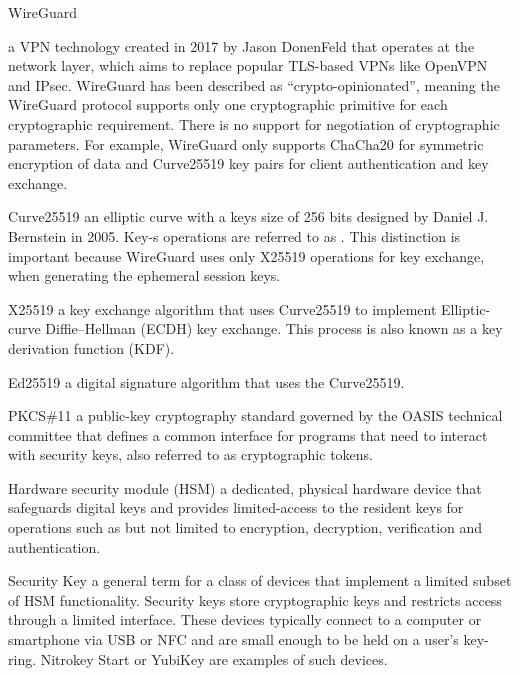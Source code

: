 \documentclass [11pt, proquest] {uwthesis}[2020/02/24]
\begin{document}
\begin{glossary}

\item[WireGuard]

a VPN technology created in 2017 by Jason DonenFeld that operates at the network layer, which aims to replace popular TLS-based VPNs like OpenVPN and IPsec.
WireGuard has been described as “crypto-opinionated”, meaning the WireGuard protocol supports only one cryptographic primitive for each cryptographic requirement.
There is no support for negotiation of cryptographic parameters. For example, WireGuard only supports ChaCha20 for symmetric 
encryption\cite{donenfeld_wireguard_2017} of data and Curve25519 key pairs for client authentication and key exchange.

\item[Curve25519]
an elliptic curve with a keys size of 256 bits designed by Daniel J. Bernstein in 2005\cite{noauthor_curve25519_nodate}. Key-s operations are referred to as . 
This distinction is important because WireGuard uses only X25519 operations for  key exchange, 
when generating the ephemeral session keys.

\item[X25519]
a key exchange algorithm that uses Curve25519 to implement Elliptic-curve Diffie–Hellman (ECDH) key exchange. This process is also known as a key derivation function (KDF).

\item[Ed25519] a digital signature algorithm that uses the Curve25519.

\item[PKCS\#11] a public-key cryptography standard governed by the OASIS technical committee\cite{noauthor_cryptsoft_nodate} that defines a common interface for programs that need to interact with security keys, also referred to as cryptographic tokens.

\item[Hardware security module]
(HSM) a dedicated, physical hardware device that safeguards digital keys and provides limited-access to the resident keys for operations such as but not limited to encryption, decryption, verification and authentication. 

\item[Security Key]
a general term for a class of devices that implement a limited subset of HSM functionality. Security keys store cryptographic keys and restricts access through a limited interface. These devices typically connect to a computer or smartphone via USB or NFC and are small enough to be held on a user's key-ring.
Nitrokey Start\cite{noauthor_nitrokey_nodate} or YubiKey\cite{noauthor_discover_nodate}\cite{noauthor_u2f_nodate-1} are examples of such devices.


\end{glossary}
\end{document}

